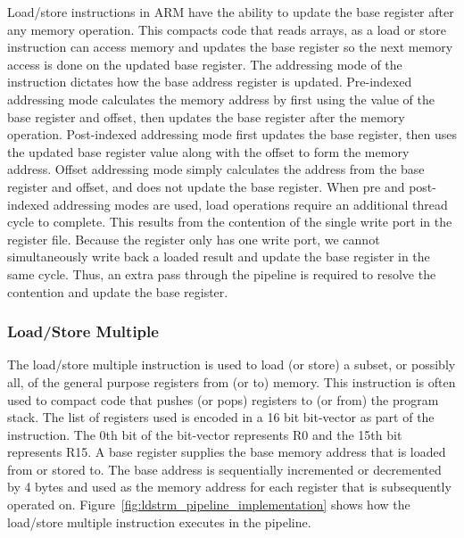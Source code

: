 Load/store instructions in ARM have the ability to update the base register after any memory operation. 
This compacts code that reads arrays, as a load or store instruction can access memory and updates the base register so the next memory access is done on the updated base register.
The addressing mode of the instruction dictates how the base address register is updated. 
Pre-indexed addressing mode calculates the memory address by first using the value of the base register and offset, then updates the base register after the memory operation. 
Post-indexed addressing mode first updates the base register, then uses the updated base register value along with the offset to form the memory address.
Offset addressing mode simply calculates the address from the base register and offset, and does not update the base register. 
When pre and post-indexed addressing modes are used, load operations require an additional thread cycle to complete.
This results from the contention of the single write port in the register file. 
Because the register only has one write port, we cannot simultaneously write back a loaded result and update the base register in the same cycle.
Thus, an extra pass through the pipeline is required to resolve the contention and update the base register. 

\subsubsection{Load/Store Multiple}
The load/store multiple instruction is used to load (or store) a subset, or possibly all, of the general purpose registers from (or to) memory.
This instruction is often used to compact code that pushes (or pops) registers to (or from) the program stack.
The list of registers used is encoded in a 16 bit bit-vector as part of the instruction.
The 0th bit of the bit-vector represents R0 and the 15th bit represents R15.
A base register supplies the base memory address that is loaded from or stored to.
The base address is sequentially incremented or decremented by 4 bytes and used as the memory address for each register that is subsequently operated on. 
Figure~\ref{fig:ldstrm_pipeline_implementation} shows how the load/store multiple instruction executes in the pipeline. 

